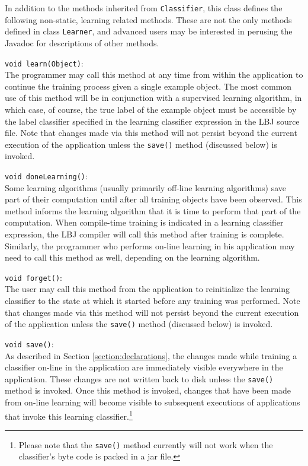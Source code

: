 In addition to the methods inherited from {\tt Classifier}, this class defines
the following non-static, learning related methods.  These are not the only
methods defined in class {\tt Learner}, and advanced users may be interested
in perusing the Javadoc for descriptions of other methods.

\begin{list}{}{}
\item[{\tt void learn(Object)}:] ~\\
The programmer may call this method at any time from within the application to
continue the training process given a single example object.  The most common
use of this method will be in conjunction with a supervised learning
algorithm, in which case, of course, the true label of the example object must
be accessible by the label classifier specified in the learning classifier
expression in the LBJ source file.  Note that changes made via this method
will not persist beyond the current execution of the application unless the
{\tt save()} method (discussed below) is invoked.

\item[{\tt void doneLearning()}:] ~\\
Some learning algorithms (usually primarily off-line learning algorithms) save
part of their computation until after all training objects have been
observed.  This method informs the learning algorithm that it is time to
perform that part of the computation.  When compile-time training is indicated
in a learning classifier expression, the LBJ compiler will call this method
after training is complete.  Similarly, the programmer who performs on-line
learning in his application may need to call this method as well, depending on
the learning algorithm.

\item[{\tt void forget()}:] ~\\
The user may call this method from the application to reinitialize the
learning classifier to the state at which it started before any training was
performed.  Note that changes made via this method will not persist beyond
the current execution of the application unless the {\tt save()} method
(discussed below) is invoked.

\item[{\tt void save()}:] ~\\
As described in Section \ref{section:declarations}, the changes made while
training a classifier on-line in the application are immediately visible
everywhere in the application.  These changes are not written back to disk
unless the {\tt save()} method is invoked.  Once this method is invoked,
changes that have been made from on-line learning will become visible to
subsequent executions of applications that invoke this learning
classifier.\footnote{Please note that the {\tt save()} method currently will
not work when the classifier's byte code is packed in a jar file.}


\end{list}
